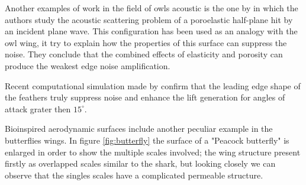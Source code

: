 Another examples of work in the field of owls acoustic is the one by \cite{jaworski2013aerodynamic} in which the authors study the acoustic scattering problem of a poroelastic half-plane hit by an incident plane wave.
This configuration has been used as an analogy with the owl wing, it try to explain how the properties of this surface can suppress the noise.
They conclude that the combined effects of elasticity and porosity can produce the weakest edge noise amplification.

Recent computational simulation made by \cite{rao2017owl} confirm that the leading edge shape of the feathers truly suppress noise and enhance the lift generation for angles of attack grater then $15^{\circ}$.


Bioinspired aerodynamic surfaces include another peculiar example in the butterflies wings.
In figure \ref{fig:butterfly} the surface of a "Peacock butterfly" is enlarged in order to show the multiple scales involved; the wing structure present firstly as overlapped scales similar to the shark, but looking closely we can observe that the singles scales have a complicated permeable structure.

